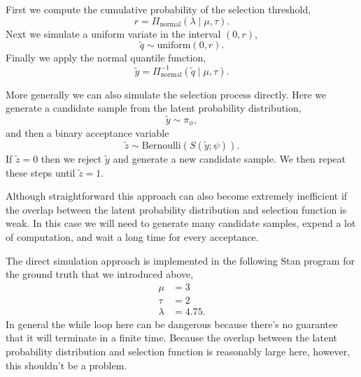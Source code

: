 \documentclass[
  letterpaper,
  DIV=11,
  numbers=noendperiod]{scrartcl}
\begin{document}
First we compute the cumulative probability of the selection threshold,
\[
r = \Pi_{\text{normal}}(\lambda \mid \mu, \tau).
\] Next we simulate a uniform variate in the interval \((0, r)\), \[
\tilde{q} \sim \text{uniform}(0, r).
\] Finally we apply the normal quantile function, \[
\tilde{y} = \Pi^{-1}_{\text{normal}}(\tilde{q} \mid \mu, \tau).
\]

More generally we can also simulate the selection process directly. Here
we generate a candidate sample from the latent probability distribution,
\[
\tilde{y} \sim \pi_{\phi},
\] and then a binary acceptance variable \[
\tilde{z} \sim \text{Bernoulli}( S(\tilde{y}; \psi) ).
\] If \(\tilde{z} = 0\) then we reject \(\tilde{y}\) and generate a new
candidate sample. We then repeat these steps until \(\tilde{z} = 1\).

Although straightforward this approach can also become extremely
inefficient if the overlap between the latent probability distribution
and selection function is weak. In this case we will need to generate
many candidate samples, expend a lot of computation, and wait a long
time for every acceptance.

The direct simulation approach is implemented in the following Stan
program for the ground truth that we introduced above, \begin{align*}
\mu &= 3
\\
\tau &= 2
\\
\lambda &= 4.75.
\end{align*} In general the while loop here can be dangerous because
there's no guarantee that it will terminate in a finite time. Because
the overlap between the latent probability distribution and selection
function is reasonably large here, however, this shouldn't be a problem.
\end{document}
